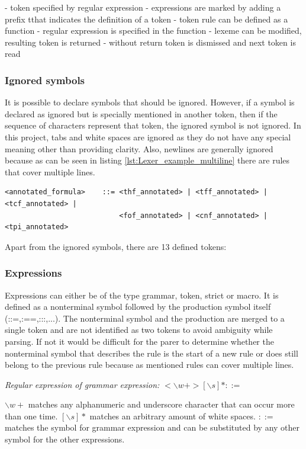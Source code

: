 - token specified by regular expression 
- expressions are marked by adding a prefix t\textunderscore that indicates the definition of a token
- token rule can be defined as a function
- regular expression is specified in the function
- lexeme can be modified, resulting token is returned
- without return token is dismissed and next token is read

\subsubsection{Ignored symbols}
It is possible to declare symbols that should be ignored. However, if a symbol is declared as ignored but is specially mentioned in another token, then if the sequence
of characters represent that token, the ignored symbol is not ignored. In this project, tabs and white spaces are ignored as they do not have any special meaning other than providing clarity.
Also, newlines are generally ignored because as can be seen in listing \ref{lst:Lexer_example_multiline} there are rules that cover multiple lines.

\begin{lstlisting}[basicstyle=\scriptsize	,caption= Multi line production rule,label= lst:Lexer_example_multiline]
<annotated_formula>    ::= <thf_annotated> | <tff_annotated> | <tcf_annotated> |
                           <fof_annotated> | <cnf_annotated> | <tpi_annotated>
\end{lstlisting}

Apart from the ignored symbols, there are 13 defined tokens:

\subsubsection{Expressions}

Expressions can either be of the type grammar, token, strict or macro. It is defined as a nonterminal symbol followed by the production symbol itself (::=,:==,:::,...). The nonterminal symbol and the production are merged to a single token and are not identified as two tokens to avoid ambiguity while parsing. If not it would be difficult for the parer to determine whether the nonterminal symbol that describes the rule is the start of a new rule or does still belong to the previous rule because as mentioned rules can cover multiple lines.

\textit{Regular expression of grammar expression:}  $<\backslash w+>[\backslash s]*::=$

$\backslash w+$ matches any alphanumeric and underscore character that can occur more than one time.
$[\backslash s]*$ matches an arbitrary amount of white spaces. $::=$ matches the symbol for grammar expression and can be substituted  by any other symbol for the other expressions.

